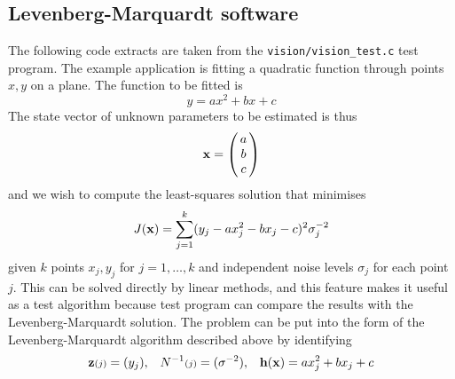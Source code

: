 \subsection{Levenberg-Marquardt software}
The following code extracts are taken from the {\tt vision/vision\_test.c}
test program. The example application is fitting a quadratic function through
points $x,y$ on a plane. The function to be fitted is
\[ y = ax^2 + bx + c
\]
The state vector of unknown parameters to be estimated is thus
\[ \xvec = \beginm{c} a \\ b \\ c \endm
\]
and we wish to compute the least-squares solution that minimises
\[ J(\xvec) = \sumjk (y_j - ax_j^2 - bx_j - c)^2 \sigma_j^{-2}
\]
given $k$ points $x_j,y_j$ for  $j=1,\ldots,k$ and independent noise
levels $\sigma_j$ for each point $j$. This can be solved directly by
linear methods, and this feature makes it useful as a test algorithm because
test program can compare the results with the Levenberg-Marquardt solution.
The problem can be put into the form of the Levenberg-Marquardt algorithm
described above by identifying
\[ \zvec\brj = (y_j),\;\;\;N\inv\brj = (\sigma^{-2}),\;\;\;
   \hvec(\xvec) = ax_j^2 + bx_j + c
\]

